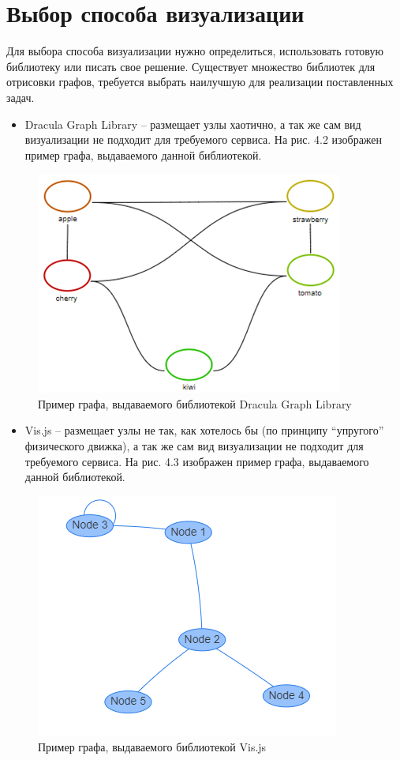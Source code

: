 \section{Выбор способа визуализации} \label{ch4:sec3}
Для выбора способа визуализации нужно определиться, использовать готовую библиотеку или писать свое решение.
Существует множество библиотек для отрисовки графов, требуется выбрать наилучшую для реализации поставленных задач.
\begin{itemize}
\item Dracula Graph Library – размещает узлы хаотично, а так же сам вид визуализации не подходит для требуемого сервиса. На рис. 4.2 изображен пример графа, выдаваемого данной библиотекой.
\end{itemize}
\begin{figure}[h]
	\center
	\includegraphics [scale=1] {my_folder/images/my/13}
	\caption{Пример графа, выдаваемого библиотекой Dracula Graph Library}
	\label{fig:13}
\end{figure}
\newpage
\begin{itemize}
\item Vis.js – размещает узлы не так, как хотелось бы (по принципу “упругого” физического движка), а так же сам вид визуализации не подходит для требуемого сервиса. На рис. 4.3 изображен пример графа, выдаваемого данной библиотекой.
\end{itemize}
\begin{figure}[h]
	\center
	\includegraphics [scale=0.9] {my_folder/images/my/14}
	\caption{Пример графа, выдаваемого библиотекой Vis.js}
	\label{fig:14}
\end{figure}
